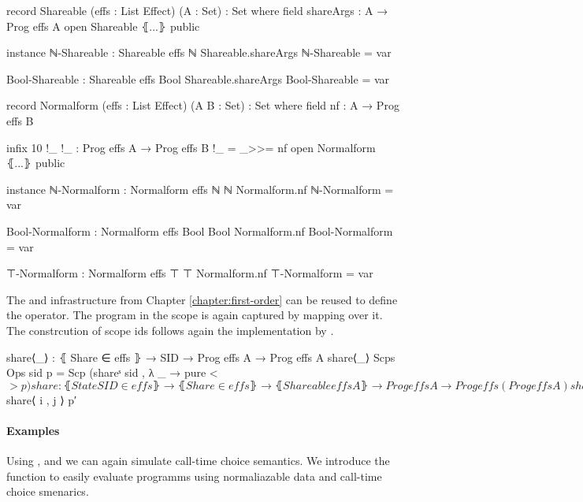 \begin{code}[hide]
record Shareable (effs : List Effect) (A : Set) : Set where
  field
    shareArgs : A → Prog effs A
open Shareable ⦃...⦄ public

instance
  ℕ-Shareable : Shareable effs ℕ
  Shareable.shareArgs ℕ-Shareable = var

  Bool-Shareable : Shareable effs Bool
  Shareable.shareArgs Bool-Shareable = var

record Normalform (effs : List Effect) (A B : Set) : Set where
  field
    nf : A → Prog effs B

  infix 10 !_
  !_ : Prog effs A → Prog effs B
  !_ = _>>= nf
open Normalform ⦃...⦄ public

instance
  ℕ-Normalform : Normalform effs ℕ ℕ
  Normalform.nf ℕ-Normalform = var

  Bool-Normalform : Normalform effs Bool Bool
  Normalform.nf Bool-Normalform = var

  ⊤-Normalform : Normalform effs ⊤ ⊤
  Normalform.nf ⊤-Normalform = var
\end{code}

The  and  infrastructure from
Chapter \ref{chapter:first-order} can be reused to define the
 operator.
The program in the scope is again captured by mapping  over it.
The constrcution of scope ids follows again the implementation by
\textcite{bunkenburg2019modeling}.

\begin{code}
share⟨_⟩ : ⦃ Share ∈ effs ⦄ → SID → Prog effs A → Prog effs A
share⟨_⟩ {Scps} {Ops} sid p = Scp (shareˢ sid , λ _ → pure <$> p)

share : ⦃ State SID ∈ effs ⦄ → ⦃ Share ∈ effs ⦄ → ⦃ Shareable effs A ⦄ →
  Prog effs A → Prog effs (Prog effs A)
share {Ops} {Scps} p = do
    (i , j) ← get
    put (i + 1 , j)
    let p′ = do
          put (i , j + 1)
          x  ← p
          x′ ← shareArgs x
          put (i + 1 , j)
          pure x′
    pure $ share⟨ i , j ⟩ p′
\end{code}

\paragraph{Examples}
Using ,  and  we
can again simulate call-time choice semantics.
We introduce the function  to easily evaluate programms
using normaliazable data and call-time choice smenarics.

